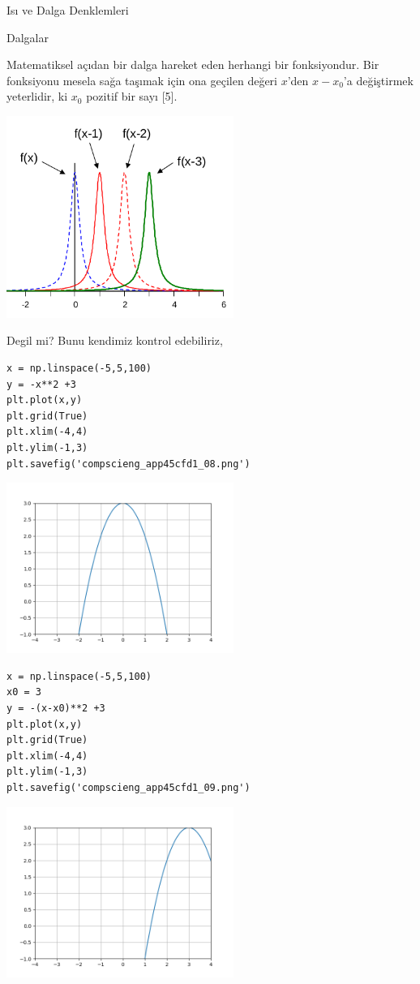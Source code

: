 \documentclass[12pt,fleqn]{article}\usepackage{../../common}
\begin{document}
Isı ve Dalga Denklemleri

Dalgalar

Matematiksel açıdan bir dalga hareket eden herhangi bir fonksiyondur. Bir
fonksiyonu mesela sağa taşımak için ona geçilen değeri $x$'den $x-x_0$'a
değiştirmek yeterlidir, ki $x_0$ pozitif bir sayı [5].

\includegraphics[width=20em]{compscieng_app45cfd1_07.png}

Degil mi? Bunu kendimiz kontrol edebiliriz,

\begin{verbatim}
x = np.linspace(-5,5,100)
y = -x**2 +3
plt.plot(x,y)
plt.grid(True)
plt.xlim(-4,4)
plt.ylim(-1,3)
plt.savefig('compscieng_app45cfd1_08.png')
\end{verbatim}

\includegraphics[width=20em]{compscieng_app45cfd1_08.png}

\begin{verbatim}
x = np.linspace(-5,5,100)
x0 = 3
y = -(x-x0)**2 +3
plt.plot(x,y)
plt.grid(True)
plt.xlim(-4,4)
plt.ylim(-1,3)
plt.savefig('compscieng_app45cfd1_09.png')
\end{verbatim}

\includegraphics[width=20em]{compscieng_app45cfd1_09.png}
\end{document}
